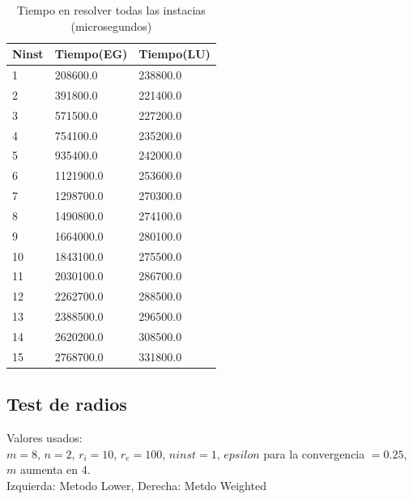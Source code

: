 \begin{table}[]
\centering
\caption{Tiempo en resolver todas las instacias (microsegundos)}
\label{tabla-instancias}
\begin{tabular}{lll}
\hline
Ninst & Tiempo(EG) & Tiempo(LU) \\ \hline
1     & 208600.0   & 238800.0   \\
2     & 391800.0   & 221400.0   \\
3     & 571500.0   & 227200.0   \\
4     & 754100.0   & 235200.0   \\
5     & 935400.0   & 242000.0   \\
6     & 1121900.0  & 253600.0   \\
7     & 1298700.0  & 270300.0   \\
8     & 1490800.0  & 274100.0   \\
9     & 1664000.0  & 280100.0   \\
10    & 1843100.0  & 275500.0   \\
11    & 2030100.0  & 286700.0   \\
12    & 2262700.0  & 288500.0   \\
13    & 2388500.0  & 296500.0   \\
14    & 2620200.0  & 308500.0   \\
15    & 2768700.0  & 331800.0   \\ \hline
\end{tabular}
\end{table}

\newpage
\subsection{Test de radios}

Valores usados: \\
$m = 8$, $n = 2$, $r_i = 10$, $r_e = 100$, $ninst = 1$, $epsilon$ para la convergencia $= 0.25$, $m$ aumenta en 4. \\

Izquierda: Metodo Lower, Derecha: Metdo Weighted \\

